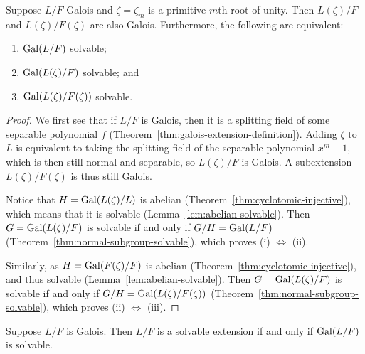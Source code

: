 \begin{lemma}\label{lem:solvable-properties}
    Suppose \(L/F\) Galois and \(\zeta = \zeta_m\) is a primitive \(m\)th root of unity.
    Then \(L(\zeta)/F\) and \(L(\zeta)/F(\zeta)\) are also Galois.
    Furthermore, the following are equivalent:
    \begin{enumerate}[label={(\roman*)}, itemsep=0mm]
        \item \(\operatorname{Gal}(L/F)\) solvable;
        \item \(\operatorname{Gal}(L(\zeta)/F)\) solvable; and
        \item \(\operatorname{Gal}(L(\zeta)/F(\zeta))\) solvable.
    \end{enumerate}
\end{lemma}
\begin{proof}
    We first see that if \(L/F\) is Galois,
    then it is a splitting field of some separable polynomial \(f\)
    (Theorem~\ref{thm:galois-extension-definition}).
    Adding \(\zeta\) to \(L\) is equivalent to
    taking the splitting field of the separable polynomial \(x^m - 1\),
    which is then still normal and separable, so \(L(\zeta)/F\) is Galois.
    A subextension \(L(\zeta)/F(\zeta)\) is thus still Galois.

    Notice that \(H = \operatorname{Gal}(L(\zeta)/L)\) is abelian (Theorem~\ref{thm:cyclotomic-injective}),
    which means that it is solvable (Lemma~\ref{lem:abelian-solvable}).
    Then \(G = \operatorname{Gal}(L(\zeta)/F)\) is solvable if and only if \(G/H = \operatorname{Gal}(L/F)\)
    (Theorem~\ref{thm:normal-subgroup-solvable}),
    which proves (i) \(\iff\) (ii).
    
    Similarly, as \(H = \operatorname{Gal}(F(\zeta)/F)\) is abelian (Theorem~\ref{thm:cyclotomic-injective}),
    and thus solvable (Lemma~\ref{lem:abelian-solvable}).
    Then \(G = \operatorname{Gal}(L(\zeta)/F)\) is solvable if and only if \(G/H = \operatorname{Gal}(L(\zeta)/F(\zeta))\)
    (Theorem~\ref{thm:normal-subgroup-solvable}),
    which proves (ii) \(\iff\) (iii).
\end{proof}
\begin{theorem}[Galois]\label{thm:solvable-galois}
    Suppose \(L/F\) is Galois.
    Then \(L/F\) is a solvable extension if and only if \(\operatorname{Gal}(L/F)\) is solvable.
\end{theorem}
